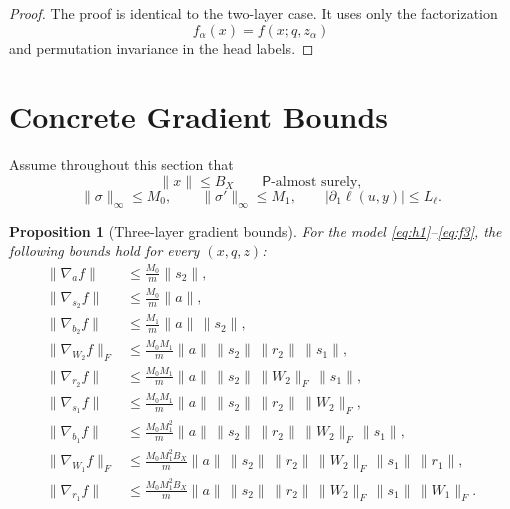 \documentclass{article}
\newtheorem{proposition}[theorem]{Proposition}
\theoremstyle{definition}
\begin{document}
\begin{proof}
The proof is identical to the two-layer case. It uses only the factorization
\[
  f_\alpha(x)=f(x;q,z_\alpha)
\]
and permutation invariance in the head labels.
\end{proof}

\section{Concrete Gradient Bounds}

Assume throughout this section that
\[
  \|x\|\le B_X
  \qquad
  \mathsf P\text{-almost surely},
\]
\[
  \|\sigma\|_\infty\le M_0,
  \qquad
  \|\sigma'\|_\infty\le M_1,
  \qquad
  |\partial_1\ell(u,y)|\le L_\ell.
\]

\begin{proposition}[Three-layer gradient bounds]
\label{prop:3layer-grads}
For the model \eqref{eq:h1}--\eqref{eq:f3}, the following bounds hold for every $(x,q,z)$:
\begin{align}
  \|\nabla_a f\|
  &\le
  \frac{M_0}{m}\|s_2\|,
  \label{eq:3g-a}
  \\
  \|\nabla_{s_2} f\|
  &\le
  \frac{M_0}{m}\|a\|,
  \label{eq:3g-s2}
  \\
  \|\nabla_{b_2} f\|
  &\le
  \frac{M_1}{m}\|a\|\,\|s_2\|,
  \label{eq:3g-b2}
  \\
  \|\nabla_{W_2} f\|_F
  &\le
  \frac{M_0M_1}{m}
  \|a\|\,\|s_2\|\,\|r_2\|\,\|s_1\|,
  \label{eq:3g-W2}
  \\
  \|\nabla_{r_2} f\|
  &\le
  \frac{M_0M_1}{m}
  \|a\|\,\|s_2\|\,\|W_2\|_F\,\|s_1\|,
  \label{eq:3g-r2}
  \\
  \|\nabla_{s_1} f\|
  &\le
  \frac{M_0M_1}{m}
  \|a\|\,\|s_2\|\,\|r_2\|\,\|W_2\|_F,
  \label{eq:3g-s1}
  \\
  \|\nabla_{b_1} f\|
  &\le
  \frac{M_0M_1^2}{m}
  \|a\|\,\|s_2\|\,\|r_2\|\,\|W_2\|_F\,\|s_1\|,
  \label{eq:3g-b1}
  \\
  \|\nabla_{W_1} f\|_F
  &\le
  \frac{M_0M_1^2B_X}{m}
  \|a\|\,\|s_2\|\,\|r_2\|\,\|W_2\|_F\,\|s_1\|\,\|r_1\|,
  \label{eq:3g-W1}
  \\
  \|\nabla_{r_1} f\|
  &\le
  \frac{M_0M_1^2B_X}{m}
  \|a\|\,\|s_2\|\,\|r_2\|\,\|W_2\|_F\,\|s_1\|\,\|W_1\|_F.
  \label{eq:3g-r1}
\end{align}
\end{proposition}
\end{document}
